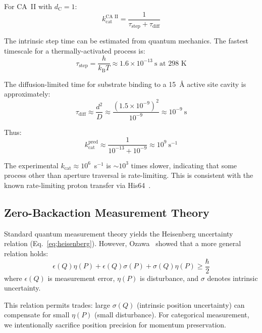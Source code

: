 \documentclass[twocolumn,amsmath,amssymb,aps,prb,superscriptaddress,longbibliography]{revtex4-2}
\newcommand{\dC}{d_{\mathrm{C}}}
\newcommand{\kcat}{k_{\mathrm{cat}}}
\newcommand{\kB}{k_{\mathrm{B}}}
\begin{document}
For CA~II with $\dC = 1$:
\begin{equation}
\kcat^{\text{CA II}} = \frac{1}{\tau_{\text{step}} + \tau_{\text{diff}}}
\end{equation}

The intrinsic step time can be estimated from quantum mechanics. The fastest timescale for a thermally-activated process is:
\begin{equation}
\tau_{\text{step}} = \frac{h}{\kB T} \approx 1.6 \times 10^{-13}~\text{s at 298 K}
\label{eq:tau-step}
\end{equation}

The diffusion-limited time for substrate binding to a 15~\AA{} active site cavity is approximately:
\begin{equation}
\tau_{\text{diff}} \approx \frac{d^2}{D} \approx \frac{(1.5 \times 10^{-9})^2}{10^{-9}} \approx 10^{-9}~\text{s}
\end{equation}

Thus:
\begin{equation}
\kcat^{\text{pred}} \approx \frac{1}{10^{-13} + 10^{-9}} \approx 10^9~\text{s}^{-1}
\end{equation}

The experimental $\kcat \approx 10^6$~s$^{-1}$ is $\sim 10^3$ times slower, indicating that some process other than aperture traversal is rate-limiting. This is consistent with the known rate-limiting proton transfer via His64~\cite{Silverman1988, Maupin2009}.

\subsection{Zero-Backaction Measurement Theory}
\label{sec:zero-backaction-theory}

Standard quantum measurement theory yields the Heisenberg uncertainty relation (Eq.~\ref{eq:heisenberg}). However, Ozawa~\cite{Ozawa2003} showed that a more general relation holds:
\begin{equation}
\epsilon(Q)\eta(P) + \epsilon(Q)\sigma(P) + \sigma(Q)\eta(P) \geq \frac{\hbar}{2}
\label{eq:ozawa}
\end{equation}
where $\epsilon(Q)$ is measurement error, $\eta(P)$ is disturbance, and $\sigma$ denotes intrinsic uncertainty.

This relation permits trades: large $\sigma(Q)$ (intrinsic position uncertainty) can compensate for small $\eta(P)$ (small disturbance). For categorical measurement, we intentionally sacrifice position precision for momentum preservation.
\end{document}
